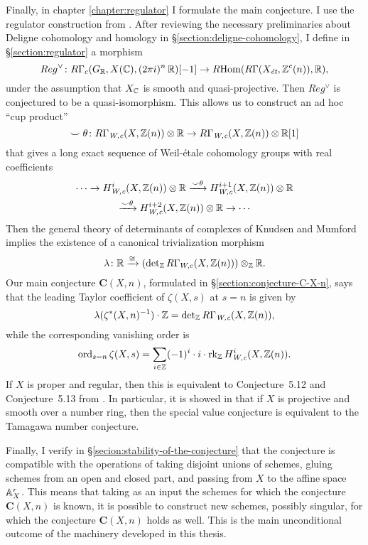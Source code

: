 Finally, in chapter \ref{chapter:regulator} I formulate the main conjecture.
I use the regulator construction from \cite{Kerr-Lewis-Muller-Stach-2006}.
After reviewing the necessary preliminaries about Deligne cohomology and
homology in \S\ref{section:deligne-cohomology}, I define in
\S\ref{section:regulator} a morphism
\[ Reg^\vee\colon R\Gamma_c (G_\RR, X (\CC), (2\pi i)^n\,\RR) [-1] \to
  \RHom (R\Gamma (X_\text{\it ét}, \ZZ^c (n)), \RR), \]
under the assumption that $X_\CC$ is smooth and quasi-projective. Then
$Reg^\vee$ is conjectured to be a quasi-isomorphism. This allows us to construct
an ad hoc ``cup product''
\[ \smile\theta\colon R\Gamma_\text{\it W,c} (X, \ZZ (n)) \otimes \RR \to
  R\Gamma_\text{\it W,c} (X, \ZZ (n)) \otimes \RR [1] \]
that gives a long exact sequence of Weil-étale cohomology groups with real
coefficients
\begin{multline*}
  \cdots \to H_\text{\it W,c}^i (X, \ZZ (n)) \otimes \RR \xrightarrow{\smile\theta}
  H_\text{\it W,c}^{i+1} (X, \ZZ (n)) \otimes \RR \\
  \xrightarrow{\smile\theta} H_\text{\it W,c}^{i+2} (X, \ZZ (n)) \otimes \RR \to \cdots
\end{multline*}
Then the general theory of determinants of complexes of Knudsen and Mumford
implies the existence of a canonical trivialization morphism
\[ \lambda\colon \RR \xrightarrow{\isom}
  (\det\nolimits_\ZZ R\Gamma_{W,c} (X,\ZZ (n))) \otimes_\ZZ \RR. \]
Our main conjecture $\mathbf{C} (X, n)$, formulated in
\S\ref{section:conjecture-C-X-n}, says that the leading Taylor coefficient of
$\zeta (X,s)$ at $s = n$ is given by
\[ \lambda (\zeta^* (X,n)^{-1})\cdot \ZZ =
  \det\nolimits_\ZZ R\Gamma_\text{\it W,c} (X, \ZZ (n)), \]
while the corresponding vanishing order is
\[ \ord_{s=n} \zeta (X,s) =
  \sum_{i\in\ZZ} (-1)^i \cdot i \cdot \rk_\ZZ H^i_\text{\it W,c} (X, \ZZ (n)). \]
If $X$ is proper and regular, then this is equivalent to Conjecture~5.12 and
Conjecture~5.13 from \cite{Flach-Morin-16}. In particular, it is showed in
\cite[\S 5.6]{Flach-Morin-16} that if $X$ is projective and smooth over a number
ring, then the special value conjecture is equivalent to the Tamagawa number
conjecture.

Finally, I verify in \S\ref{secion:stability-of-the-conjecture} that the
conjecture is compatible with the operations of taking disjoint unions of
schemes, gluing schemes from an open and closed part, and passing from $X$ to
the affine space $\AA^r_X$. This means that taking as an input the schemes for
which the conjecture $\mathbf{C} (X, n)$ is known, it is possible to construct
new schemes, possibly singular, for which the conjecture $\mathbf{C} (X, n)$
holds as well. This is the main unconditional outcome of the machinery developed
in this thesis.
